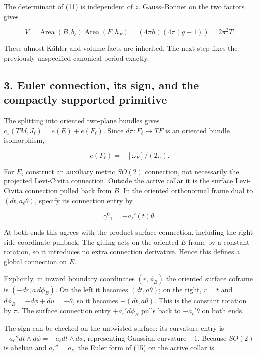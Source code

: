 \documentclass[
  11pt,
]{article}
\begin{document}
The determinant of (11) is independent of \(z\). Gauss--Bonnet on the
two factors gives

\[
 V=\operatorname{Area}(B,b_\ell)\operatorname{Area}(F,h_F)
   =(4\pi h)(4\pi(g-1))=2\pi^2T.
 \tag{13}
\]

These almost-Kähler and volume facts are inherited. The next step fixes
the previously unspecified canonical period exactly.

\hypertarget{euler-connection-its-sign-and-the-compactly-supported-primitive}{%
\subsection{3. Euler connection, its sign, and the compactly supported
primitive}\label{euler-connection-its-sign-and-the-compactly-supported-primitive}}

The splitting into oriented two-plane bundles gives
\(c_1(TM,J_\ell)=e(E)+e(F_\ell)\). Since \(d\pi:F_\ell\to TF\) is an
oriented bundle isomorphism,

\[
 e(F_\ell)=-[\omega_F]/(2\pi).
 \tag{14}
\]

For \(E\), construct an auxiliary metric \(SO(2)\) connection, not
necessarily the projected Levi-Civita connection. Outside the active
collar it is the surface Levi-Civita connection pulled back from \(B\).
In the oriented orthonormal frame dual to \((dt,a_\ell\theta)\), specify
its connection entry by

\[
 \gamma^0{}_1=-a_\ell'(t)\theta.
 \tag{15}
\]

At both ends this agrees with the product surface connection, including
the right-side coordinate pullback. The gluing acts on the oriented
\(E\)-frame by a constant rotation, so it introduces no extra connection
derivative. Hence this defines a global connection on \(E\).

Explicitly, in inward boundary coordinates \((r,\phi_B)\) the oriented
surface coframe is \((-dr,a\,d\phi_B)\). On the left it becomes
\((dt,a\theta)\); on the right, \(r=t\) and
\(d\phi_B=-d\phi+du=-\theta\), so it becomes \(-(dt,a\theta)\). This is
the constant rotation by \(\pi\). The surface connection entry
\(+a_r'd\phi_B\) pulls back to \(-a_t'\theta\) on both ends.

The sign can be checked on the untwisted surface: its curvature entry is
\(-a_\ell''dt\wedge d\phi=-a_\ell dt\wedge d\phi\), representing
Gaussian curvature \(-1\). Because \(SO(2)\) is abelian and
\(a_\ell''=a_\ell\), the Euler form of (15) on the active collar is
\end{document}
